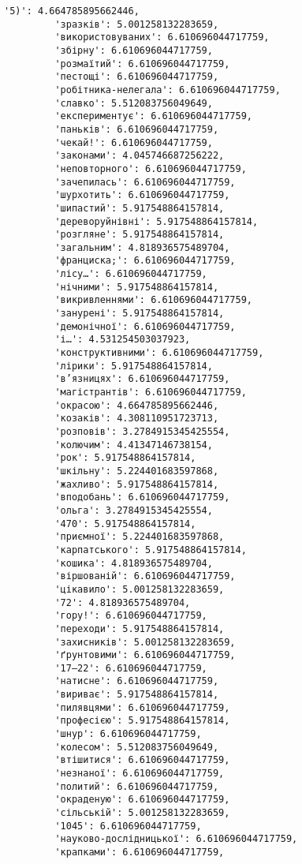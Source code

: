 \documentclass[11pt]{article}
\begin{document}
\begin{Verbatim}[commandchars=\\\{\}]
         '5)': 4.664785895662446,
         'зразків': 5.001258132283659,
         'використовуваних': 6.610696044717759,
         'збірну': 6.610696044717759,
         'розмаїтий': 6.610696044717759,
         'пестощі': 6.610696044717759,
         'робітника-нелегала': 6.610696044717759,
         'славко': 5.512083756049649,
         'експериментує': 6.610696044717759,
         'паньків': 6.610696044717759,
         'чекай!': 6.610696044717759,
         'законами': 4.045746687256222,
         'неповторного': 6.610696044717759,
         'зачепилась': 6.610696044717759,
         'шурхотить': 6.610696044717759,
         'шипастий': 5.917548864157814,
         'дереворуйнівні': 5.917548864157814,
         'розгляне': 5.917548864157814,
         'загальним': 4.818936575489704,
         'франциска;': 6.610696044717759,
         'лісу…': 6.610696044717759,
         'нічними': 5.917548864157814,
         'викривленнями': 6.610696044717759,
         'занурені': 5.917548864157814,
         'демонічної': 6.610696044717759,
         'і…': 4.531254503037923,
         'конструктивними': 6.610696044717759,
         'лірики': 5.917548864157814,
         'в’язницях': 6.610696044717759,
         'магістрантів': 6.610696044717759,
         'окрасою': 4.664785895662446,
         'козаків': 4.308110951723713,
         'розповів': 3.2784915345425554,
         'колючим': 4.41347146738154,
         'рок': 5.917548864157814,
         'шкільну': 5.224401683597868,
         'жахливо': 5.917548864157814,
         'вподобань': 6.610696044717759,
         'ольга': 3.2784915345425554,
         '470': 5.917548864157814,
         'приємної': 5.224401683597868,
         'карпатського': 5.917548864157814,
         'кошика': 4.818936575489704,
         'віршованій': 6.610696044717759,
         'цікавило': 5.001258132283659,
         '72': 4.818936575489704,
         'гору!': 6.610696044717759,
         'переходи': 5.917548864157814,
         'захисників': 5.001258132283659,
         'ґрунтовими': 6.610696044717759,
         '17–22': 6.610696044717759,
         'натисне': 6.610696044717759,
         'вириває': 5.917548864157814,
         'пилявцями': 6.610696044717759,
         'професією': 5.917548864157814,
         'шнур': 6.610696044717759,
         'колесом': 5.512083756049649,
         'втішитися': 6.610696044717759,
         'незнаної': 6.610696044717759,
         'политий': 6.610696044717759,
         'окраденую': 6.610696044717759,
         'сільській': 5.001258132283659,
         '1045': 6.610696044717759,
         'науково-дослідницької': 6.610696044717759,
         'крапками': 6.610696044717759,

\end{Verbatim}
\end{document}

